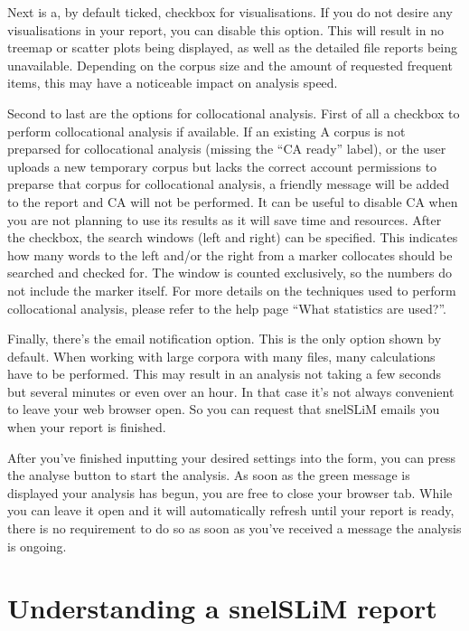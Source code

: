 \documentclass[11pt,a4paper]{article}
\begin{document}
Next is a, by default ticked, checkbox for visualisations. If you do not desire any visualisations in your report, you can disable this option. This will result in no treemap or scatter plots being displayed, as well as the detailed file reports being unavailable. Depending on the corpus size and the amount of requested frequent items, this may have a noticeable impact on analysis speed.

Second to last are the options for collocational analysis. First of all a checkbox to perform collocational analysis if available. If an existing A corpus is not preparsed for collocational analysis (missing the ``CA ready'' label), or the user uploads a new temporary corpus but lacks the correct account permissions to preparse that corpus for collocational analysis, a friendly message will be added to the report and CA will not be performed. It can be useful to disable CA when you are not planning to use its results as it will save time and resources. After the checkbox, the search windows (left and right) can be specified. This indicates how many words to the left and/or the right from a marker collocates should be searched and checked for. The window is counted exclusively, so the numbers do not include the marker itself. For more details on the techniques used to perform collocational analysis, please refer to the help page ``What statistics are used?''.

Finally, there's the email notification option. This is the only option shown by default. When working with large corpora with many files, many calculations have to be performed. This may result in an analysis not taking a few seconds but several minutes or even over an hour. In that case it's not always convenient to leave your web browser open. So you can request that snelSLiM emails you when your report is finished.

After you've finished inputting your desired settings into the form, you can press the analyse button to start the analysis. As soon as the green message is displayed your analysis has begun, you are free to close your browser tab. While you can leave it open and it will automatically refresh until your report is ready, there is no requirement to do so as soon as you've received a message the analysis is ongoing.

\section{Understanding a snelSLiM report}
\end{document}

